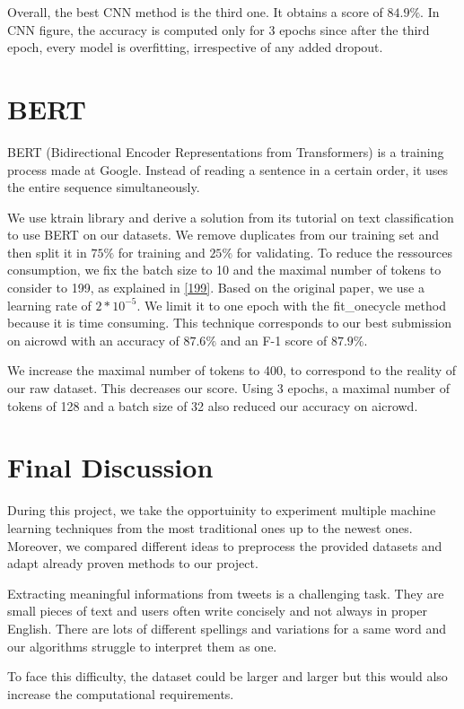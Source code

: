 \documentclass[11pt, a4paper, twocolumn]{article}
\begin{document}
Overall, the best CNN method is the third one. It obtains a score of $84.9\%$. In CNN figure, the accuracy is computed only for 3 epochs since after the third epoch, every model is overfitting, irrespective of any added dropout.

\section{BERT}
BERT (Bidirectional Encoder Representations from Transformers)\cite{bertpaper} is a training process made at Google. Instead of reading a sentence in a certain order, it uses the entire sequence simultaneously.

We use ktrain library\cite{ktrain} and derive a solution from its tutorial on text classification to use BERT on our datasets. We remove duplicates from our training set and then split it in $75\%$ for training and $25\%$ for validating. To reduce the ressources consumption, we fix the batch size to 10 and the maximal number of tokens to consider to 199, as explained in \ref{199}. Based on the original paper, we use a learning rate of $2*10^{-5}$. We limit it to one epoch with the fit\_onecycle method because it is time consuming. This technique corresponds to our best submission on aicrowd with an accuracy of $87.6\%$ and an F-1 score of $87.9\%$.

We increase the maximal number of tokens to 400, to correspond to the reality of our raw dataset. This decreases our score. Using 3 epochs, a maximal number of tokens of 128 and a batch size of 32 also reduced our accuracy on aicrowd.

\section{Final Discussion}
During this project, we take the opportuinity to experiment multiple machine learning techniques from the most traditional ones up to the newest ones. Moreover, we compared different ideas to preprocess the provided datasets and adapt already proven methods to our project.

Extracting meaningful informations from tweets is a challenging task. They are small pieces of text and users often write concisely and not always in proper English. There are lots of different spellings and variations for a same word and our algorithms struggle to interpret them as one.

To face this difficulty, the dataset could be larger and larger but this would also increase the computational requirements.
\end{document}
